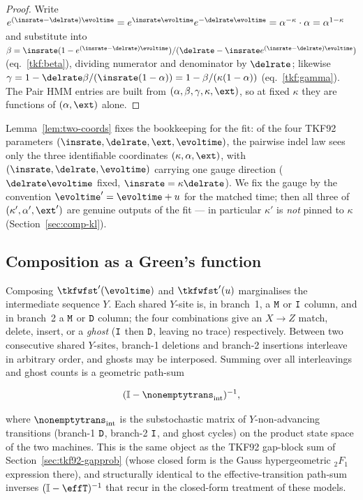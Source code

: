 \begin{proof}
Write $e^{(\insrate-\delrate)\evoltime}
= e^{\insrate\evoltime} e^{-\delrate\evoltime}
= \alpha^{-\kappa}\cdot\alpha = \alpha^{1-\kappa}$ and substitute into
$\beta = \insrate(1-e^{(\insrate-\delrate)\evoltime})
/(\delrate-\insrate e^{(\insrate-\delrate)\evoltime})$
(eq.~\eqref{tkf:beta}), dividing numerator and denominator by $\delrate$;
likewise $\gamma = 1 - \delrate\beta/(\insrate(1-\alpha))
= 1-\beta/(\kappa(1-\alpha))$ (eq.~\eqref{tkf:gamma}).
The Pair HMM entries are built from $(\alpha,\beta,\gamma,\kappa,\ext)$,
so at fixed $\kappa$ they are functions of $(\alpha,\ext)$ alone.
\end{proof}

Lemma~\ref{lem:two-coords} fixes the bookkeeping for the fit:
of the four TKF92 parameters $(\insrate,\delrate,\ext,\evoltime)$, the
pairwise indel law sees only the three identifiable coordinates
$(\kappa,\alpha,\ext)$, with $(\insrate,\delrate,\evoltime)$ carrying one
gauge direction ($\delrate\evoltime$ fixed, $\insrate=\kappa\delrate$).
We fix the gauge by the convention $\evoltime' = \evoltime+\evolu$ for the
matched time; then all three of $(\kappa',\alpha',\ext')$ are genuine
outputs of the fit --- in particular $\kappa'$ is \emph{not} pinned to
$\kappa$ (Section~\ref{sec:comp-kl}).

\subsection{Composition as a Green's function}
\label{sec:comp-greens}

Composing $\tkfwfst'(\evoltime)$ and $\tkfwfst'(\evolu)$ marginalises the
intermediate sequence $Y$.  Each shared $Y$-site is, in branch~1, a
$\mathtt{M}$ or $\mathtt{I}$ column, and in branch~2 a $\mathtt{M}$ or $\mathtt{D}$ column; the
four combinations give an $X\!\to\!Z$ match, delete, insert, or a
\emph{ghost} ($\mathtt{I}$ then $\mathtt{D}$, leaving no trace) respectively.  Between
two consecutive shared $Y$-sites, branch-1 deletions and branch-2
insertions interleave in arbitrary order, and ghosts may be interposed.
Summing over all interleavings and ghost counts is a geometric path-sum

\begin{equation}
\label{eq:comp-greens}
(\mathbb{I} - \nonemptytrans_{\mathrm{int}})^{-1},
\end{equation}

where $\nonemptytrans_{\mathrm{int}}$ is the substochastic matrix of
$Y$-non-advancing transitions (branch-1 $\mathtt{D}$, branch-2 $\mathtt{I}$, and
ghost cycles) on the product state space of the two machines.  This is
the same object as the TKF92 gap-block sum of
Section~\ref{sec:tkf92-gapprob} (whose closed form is the Gauss
hypergeometric ${}_2F_1$ expression there), and structurally identical to
the effective-transition path-sum inverses $(\mathbb{I}-\effT)^{-1}$ that
recur in the closed-form treatment of these models.

